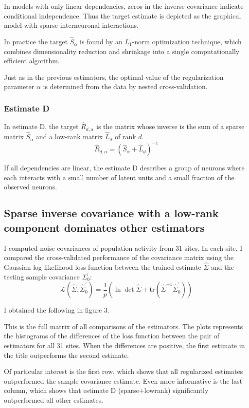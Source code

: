 In models with only linear dependencies, zeros in the inverse covariance indicate conditional independence. Thus the target estimate is depicted as the graphical model with sparse interneuronal interactions.

In practice the target $\hat S_\alpha$ is found by an $ L_1$-norm optimization technique, which combines dimensionality reduction and shrinkage into a single computationally efficient algorithm.

Just as in the previous estimators, the optimal value of the regularization parameter $ \alpha$ is determined from the data by nested cross-validation.

\subsubsection*{Estimate D}
In estimate D, the target $\hat R_{d,\alpha}$ is the matrix whose inverse is the sum of a sparse matrix $\hat S_\alpha$ and a low-rank matrix $\hat L_d$ of rank $d$.
\begin{equation}
\hat R_{d,\alpha} = (\hat S_\alpha + \hat L_d)^{-1}
\end{equation}

If all dependencies are linear, the estimate D describes a group of neurons where each interacts with a small number of latent units and a small fraction of the observed neurons. 

\subsection*{Sparse inverse covariance with a low-rank component dominates other estimators}
I computed noise covariances of population activity from 31 sites.  In each site, I compared the cross-validated performance of the covariance matrix using the Gaussian log-likelihood loss function between the trained estimate $ \hat\Sigma$ and the testing sample covariance $ \Sigma_0^\prime$:
\begin{equation}
\mathcal L(\hat\Sigma,\hat\Sigma_0^\prime) = 
\frac 1 p\left( \ln \det \hat \Sigma + \mbox{tr}(\hat \Sigma^{-1}\hat\Sigma_0^\prime) \right) 
\end{equation}

I obtained the following in figure 3.

This is the full matrix of all comparisons of the estimators.  The plots represents the histograms of the differences of the loss function between the pair of estimators for all 31 sites.  When the differences are positive, the first estimate in the title outperforms the second estimate.

Of particular interest is the first row, which shows that all regularized estimates  outperformed the sample covariance estimate.  Even more informative is the last column, which shows that estimate D (sparse+lowrank) significantly outperformed all other estimates.



